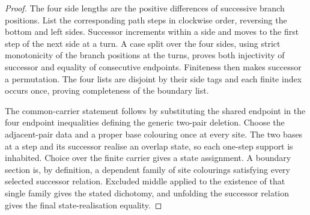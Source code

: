 \begin{proof}
The four side lengths are the positive differences of successive branch
positions.  List the corresponding path steps in clockwise order, reversing
the bottom and left sides.  Successor increments within a side and moves to
the first step of the next side at a turn.  A case split over the four sides,
using strict monotonicity of the branch positions at the turns, proves both
injectivity of successor and equality of consecutive endpoints.  Finiteness
then makes successor a permutation.  The four lists are disjoint by their
side tags and each finite index occurs once, proving completeness of the
boundary list.

The common-carrier statement follows by substituting the shared endpoint in
the four endpoint inequalities defining the generic two-pair deletion.
Choose the adjacent-pair data and a proper base colouring once at every
site.  The two bases at a step and its successor realise an overlap state, so
each one-step support is inhabited.  Choice over the finite carrier gives a
state assignment.  A boundary section is, by definition, a dependent family
of site colourings satisfying every selected successor relation.  Excluded
middle applied to the existence of that single family gives the stated
dichotomy, and unfolding the successor relation gives the final
state-realisation equality.
\end{proof}

